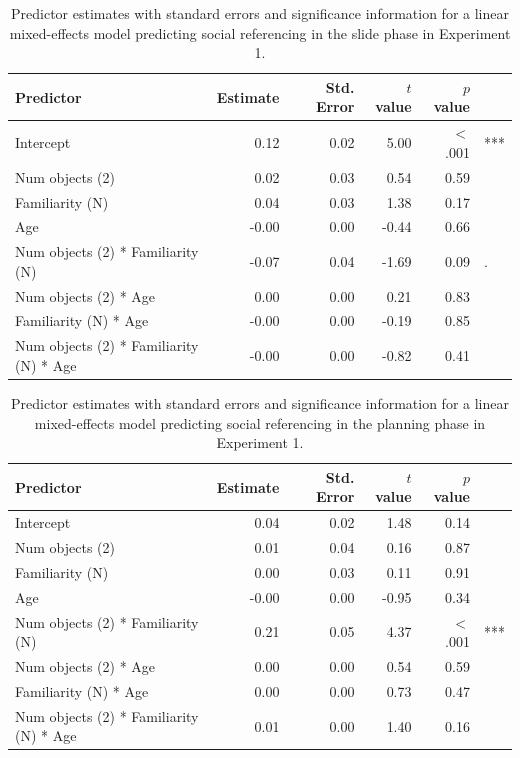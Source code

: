 \documentclass[a4paper,man,apacite,floatsintext]{apa6}
\begin{document}
\begin{table}[b]
\centering
\begin{tabular}{lrrrrl}
 Predictor & Estimate & Std. Error & $t$ value & $p$ value &  \\ 
  \hline
Intercept & 0.12 & 0.02 & 5.00 & $<$ .001 & *** \\ 
  Num objects (2) & 0.02 & 0.03 & 0.54 & 0.59 &  \\ 
  Familiarity (N) & 0.04 & 0.03 & 1.38 & 0.17 &  \\ 
  Age & -0.00 & 0.00 & -0.44 & 0.66 &  \\ 
  Num objects (2) * Familiarity (N) & -0.07 & 0.04 & -1.69 & 0.09 & . \\ 
  Num objects (2) * Age & 0.00 & 0.00 & 0.21 & 0.83 &  \\ 
  Familiarity (N) * Age & -0.00 & 0.00 & -0.19 & 0.85 &  \\ 
  Num objects (2) * Familiarity (N) * Age & -0.00 & 0.00 & -0.82 & 0.41 &  \\ 
   \hline
\end{tabular}
\caption{Predictor estimates with standard errors and significance information for a linear mixed-effects model predicting social referencing in the slide phase in Experiment 1.} 
\label{tab:exp1_s_reg}
\end{table}

\begin{table}[b]
\centering
\begin{tabular}{lrrrrl}
 Predictor & Estimate & Std. Error & $t$ value & $p$ value &  \\ 
  \hline
Intercept & 0.04 & 0.02 & 1.48 & 0.14 &  \\ 
  Num objects (2) & 0.01 & 0.04 & 0.16 & 0.87 &  \\ 
  Familiarity (N) & 0.00 & 0.03 & 0.11 & 0.91 &  \\ 
  Age & -0.00 & 0.00 & -0.95 & 0.34 &  \\ 
  Num objects (2) * Familiarity (N) & 0.21 & 0.05 & 4.37 & $<$ .001 & *** \\ 
  Num objects (2) * Age & 0.00 & 0.00 & 0.54 & 0.59 &  \\ 
  Familiarity (N) * Age & 0.00 & 0.00 & 0.73 & 0.47 &  \\ 
  Num objects (2) * Familiarity (N) * Age & 0.01 & 0.00 & 1.40 & 0.16 &  \\ 
   \hline
\end{tabular}
\caption{Predictor estimates with standard errors and significance information for a linear mixed-effects model predicting social referencing in the planning phase in Experiment 1.} 
\label{tab:exp1_p_reg}
\end{table}
\end{document}
